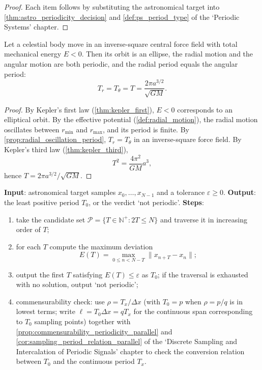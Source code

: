 \begin{proof}
Each item follows by substituting the astronomical target into \cref{thm:astro_periodicity_decision} and \cref{def:ps_period_type} of the `Periodic Systems' chapter.
\end{proof}

\begin{lemma}\label{lem:kepler_period}
Let a celestial body move in an inverse-square central force field with total mechanical energy \(E<0\). Then its orbit is an ellipse, the radial motion and the angular motion are both periodic, and the radial period equals the angular period:
\[
T_r=T_\theta=T=\frac{2\pi a^{3/2}}{\sqrt{GM}}.
\]
\end{lemma}

\begin{proof}
By Kepler's first law (\cref{thm:kepler_first}), \(E<0\) corresponds to an elliptical orbit. By the effective potential (\cref{def:radial_motion}), the radial motion oscillates between \(r_{\min}\) and \(r_{\max}\), and its period is finite. By \cref{prop:radial_oscillation_period}, \(T_r=T_\theta\) in an inverse-square force field. By Kepler's third law (\cref{thm:kepler_third}),
\[
T^2=\frac{4\pi^2}{GM}a^3,
\]
hence \(T=2\pi a^{3/2}/\sqrt{GM}\).
\end{proof}

\begin{definition}\label{def:astro_minimal_period_algorithm}
\textbf{Input}: astronomical target samples \(x_0,\dots,x_{N-1}\) and a tolerance \(\varepsilon\ge0\).
\textbf{Output}: the least positive period \(T_0\), or the verdict `not periodic'.
\textbf{Steps}:
\begin{enumerate}[label=(\arabic*)]
    \item take the candidate set \(\mathcal P=\{T\in\mathbb N^+:2T\le N\}\) and traverse it in increasing order of \(T\);
    \item for each \(T\) compute the maximum deviation
    \[
    E(T)=\max_{0\le n<N-T}\|x_{n+T}-x_n\|;
    \]
    \item output the first \(T\) satisfying \(E(T)\le\varepsilon\) as \(T_0\); if the traversal is exhausted with no solution, output `not periodic';
    \item commensurability check: use \(\rho=T_x/\Delta x\) (with \(T_0=p\) when \(\rho=p/q\) is in lowest terms; write \(\ell=T_0\Delta x=qT_x\) for the continuous span corresponding to \(T_0\) sampling points) together with \cref{prop:commensurability_periodicity_parallel} and \cref{cor:sampling_period_relation_parallel} of the `Discrete Sampling and Intercalation of Periodic Signals' chapter to check the conversion relation between \(T_0\) and the continuous period \(T_x\).
\end{enumerate}
\end{definition}


